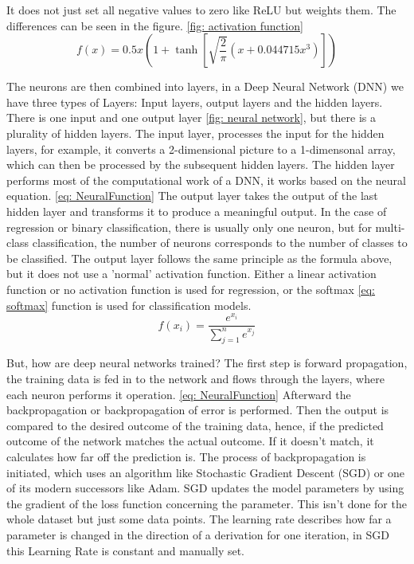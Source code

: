 It does not just set all negative values to zero like ReLU but weights them.
The differences can be seen in the figure. \ref{fig: activation function}
\begin{equation}
    f(x) = 0.5x\left ( 1+\tanh\left [ \sqrt{\frac{2}{\pi}}\left ( x+0.044715x^3 \right ) \right ] \right )
    \label{eq: gelu}
\end{equation}

The neurons are then combined into layers, in a Deep Neural Network (DNN) we have three types of Layers:
Input layers, output layers and the hidden layers.
There is one input and one output layer \ref{fig: neural network}, but there is a plurality of hidden layers.
The input layer, processes the input for the hidden layers, for example, it converts a 2-dimensional picture to a 1-dimensonal array, which can then be processed by the subsequent hidden layers.
The hidden layer performs most of the computational work of a DNN, it works based on the neural equation. \ref{eq: NeuralFunction}
The output layer takes the output of the last hidden layer and transforms it to produce a meaningful output.
In the case of regression or binary classification, there is usually only one neuron, but for multi-class classification, the number of neurons corresponds to the number of classes to be classified.
The output layer follows the same principle as the formula above, but it does not use a 'normal' activation function.
Either a linear activation function or no activation function is used for regression, or the softmax \ref{eq: softmax} function is used for classification models.
\begin{equation}
    f(x_i) = \frac{e^{x_i}}{\sum^n_{j=1}e^{x_j}}
    \label{eq: softmax}
\end{equation}

But, how are deep neural networks trained? \cite{lecun_deep_2015}
The first step is forward propagation, the training data is fed in to the network and flows through the layers, where each neuron performs it operation. \ref{eq: NeuralFunction}
Afterward the backpropagation or backpropagation of error is performed. \cite{rumelhart_learning_1986}
Then the output is compared to the desired outcome of the training data, hence, if the predicted outcome of the network matches the actual outcome.
If it doesn't match, it calculates how far off the prediction is.
The process of backpropagation is initiated, which uses an algorithm like Stochastic Gradient Descent (SGD) or one of its modern successors like Adam.
SGD updates the model parameters by using the gradient of the loss function concerning the parameter.
This isn't done for the whole dataset but just some data points.
The learning rate describes how far a parameter is changed in the direction of a derivation for one iteration, in SGD this Learning Rate is constant and manually set.

